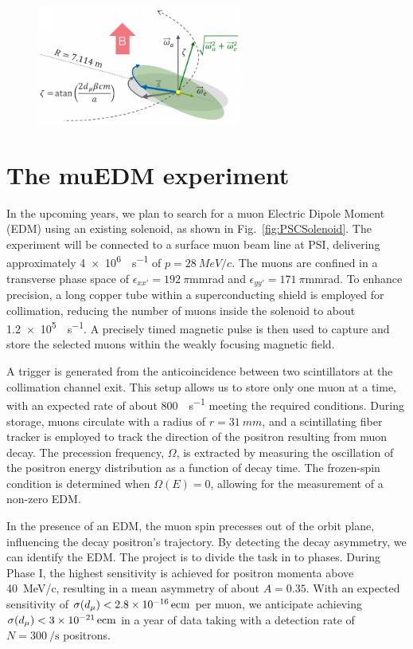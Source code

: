 \begin{refsection}
        \begin{figure}
            \centering
            \includegraphics[width = 0.6\textwidth]{Figures/muEDM/g-2_EDM.png}
            \caption{}
            \label{fig:muEDM:g-2_EDM}
        \end{figure}

\section{The muEDM experiment}
    In the upcoming years, we plan to search for a muon Electric Dipole Moment (EDM) using an existing solenoid, as shown in Fig.~\ref{fig:PSCSolenoid}. 
    The experiment will be connected to a surface muon beam line at PSI, delivering approximately \SI{4e6}{\upmu \per s} of $p=\SI{28}{MeV/c}$. 
    The muons are confined in a transverse phase space of $\epsilon_{xx'}= 192\ \pi$mmrad and $\epsilon_{yy'}= 171\ \pi$mmrad. 
    To enhance precision, a long copper tube within a superconducting shield is employed for collimation, reducing the number of muons inside the solenoid to about \SI{1.2e5}{\upmu \per s}. 
    A precisely timed magnetic pulse is then used to capture and store the selected muons within the weakly focusing magnetic field.
    
    A trigger is generated from the anticoincidence between two scintillators at the collimation channel exit. 
    This setup allows us to store only one muon at a time, with an expected rate of about \SI{800}{\upmu \per s} meeting the required conditions. 
    During storage, muons circulate with a radius of $r=\SI{31}{mm}$, and a scintillating fiber tracker is employed to track the direction of the positron resulting from muon decay. 
    The precession frequency, $\Omega$, is extracted by measuring the oscillation of the positron energy distribution as a function of decay time. 
    The frozen-spin condition is determined when $\Omega(E)=0$, allowing for the measurement of a non-zero EDM.
    
    In the presence of an EDM, the muon spin precesses out of the orbit plane, influencing the decay positron's trajectory. 
    By detecting the decay asymmetry, we can identify the EDM. 
    The project is to divide the task in to phases.
    During Phase I, the highest sensitivity is achieved for positron momenta above \SI{40}{MeV/c}, resulting in a mean asymmetry of about $A=0.35$.
    With an expected sensitivity of $\sigma(d_\mu)<\SI{2.8E-16}{ecm}$ per muon, we anticipate achieving $\sigma(d_\mu)<\SI{3E-21}{ecm}$ in a year of data taking with a detection rate of $N=\SI{300}{\per\second}$ positrons.
    

\end{refsection}
